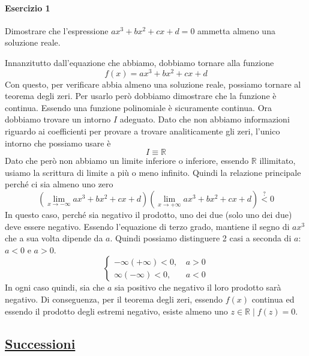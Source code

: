\paragraph{Esercizio 1}
Dimostrare che l'espressione $ax^3+bx^2+cx+d=0$ ammetta almeno una soluzione reale.
\divisor

Innanzitutto dall'equazione che abbiamo, dobbiamo tornare alla funzione
\begin{equation*}
  f(x) = ax^3+bx^2+cx+d
\end{equation*}
Con questo, per verificare abbia almeno una soluzione reale, possiamo tornare al teorema degli
zeri. Per usarlo però dobbiamo dimostrare che la funzione è continua. Essendo una funzione
polinomiale è sicuramente continua. Ora dobbiamo trovare un intorno $I$ adeguato. Dato che non
abbiamo informazioni riguardo ai coefficienti per provare a trovare analiticamente gli zeri,
l'unico intorno che possiamo usare è
\begin{equation*}
  I\equiv\mathbb{R}
\end{equation*}
Dato che però non abbiamo un limite inferiore o inferiore, essendo $\mathbb{R}$ illimitato, 
usiamo la scrittura di limite a più o meno infinito. Quindi la relazione principale perché
ci sia almeno uno zero
\begin{equation*}
  \left( \lim\limits_{x\to-\infty} ax^3+bx^2+cx+d \right)
  \left( \lim\limits_{x\to+\infty} ax^3+bx^2+cx+d \right) \overset{?}{<} 0
\end{equation*}
In questo caso, perché sia negativo il prodotto, uno dei due (solo uno dei due) deve essere
negativo. Essendo l'equazione di terzo grado, mantiene il segno di $ax^3$ che a sua volta dipende
da $a$. Quindi possiamo distinguere 2 casi a seconda di $a$: $a<0$ e $a>0$.
\begin{equation*}
  \begin{cases}
    -\infty(+\infty) < 0,&\, a>0\\
    \infty(-\infty) < 0,&\, a<0
  \end{cases}
\end{equation*}
In ogni caso quindi, sia che $a$ sia positivo che negativo il loro prodotto sarà negativo. Di
conseguenza, per il teorema degli zeri, essendo $f(x)$ continua ed essendo il prodotto degli
estremi negativo, esiste almeno uno $z\in\mathbb{R}\mid f(z)=0$.

\subsection*{\hyperref[sec:successioni]{Successioni}}
\label{sub:successioni}

